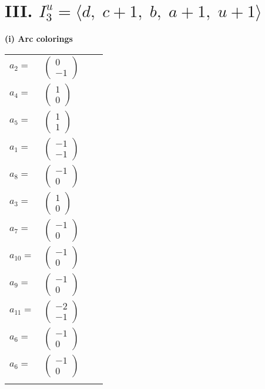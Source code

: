 \documentclass[1p]{elsarticle_modified}
\theoremstyle{definition}
\begin{document}
\centering \section*{III. $I^u_{3}= \langle d,\;c+1,\;b,\;a+1,\;u+1 \rangle$}
\flushleft \textbf{(i) Arc colorings}\\
\begin{tabular}{m{7pt} m{180pt} m{7pt} m{180pt} }
\flushright $a_{2}=$&$\begin{pmatrix}0\\-1\end{pmatrix}$ \\
\flushright $a_{4}=$&$\begin{pmatrix}1\\0\end{pmatrix}$ \\
\flushright $a_{5}=$&$\begin{pmatrix}1\\1\end{pmatrix}$ \\
\flushright $a_{1}=$&$\begin{pmatrix}-1\\-1\end{pmatrix}$ \\
\flushright $a_{8}=$&$\begin{pmatrix}-1\\0\end{pmatrix}$ \\
\flushright $a_{3}=$&$\begin{pmatrix}1\\0\end{pmatrix}$ \\
\flushright $a_{7}=$&$\begin{pmatrix}-1\\0\end{pmatrix}$ \\
\flushright $a_{10}=$&$\begin{pmatrix}-1\\0\end{pmatrix}$ \\
\flushright $a_{9}=$&$\begin{pmatrix}-1\\0\end{pmatrix}$ \\
\flushright $a_{11}=$&$\begin{pmatrix}-2\\-1\end{pmatrix}$ \\
\flushright $a_{6}=$&$\begin{pmatrix}-1\\0\end{pmatrix}$\\ \flushright $a_{6}=$&$\begin{pmatrix}-1\\0\end{pmatrix}$\\&\end{tabular}
\end{document}
